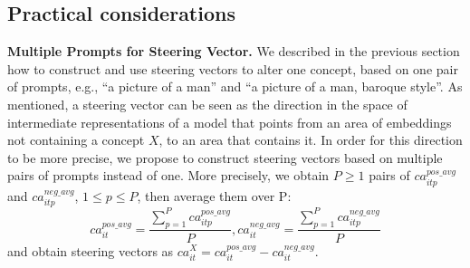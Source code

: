  
\subsection{Practical considerations}
\label{3.4}

\noindent\textbf{Multiple Prompts for Steering Vector.} 
We described in the previous section how to construct and use steering vectors to alter one concept,  based on one pair of prompts, e.g., ``a picture of a man'' and ``a picture of a man, baroque style''.
%
As mentioned, a steering vector can be seen as the direction in the space of intermediate representations of a model that points from an area of embeddings not containing a concept $X$, to an area that contains it.
%
In order for this direction to be more precise, we propose to construct steering vectors based on multiple pairs of prompts instead of one.
%
More precisely, we obtain $P \geqslant 1$ pairs of $ca^{pos\_avg}_{itp}$ and $ca^{neg\_avg}_{itp}$, $1 \leqslant p \leqslant P$, then average them over P:
\begin{equation}
    ca^{pos\_avg}_{it} = \frac{\sum_{p=1}^{P}ca^{pos\_avg}_{itp}}{P}, ca^{neg\_avg}_{it} = \frac{\sum_{p=1}^{P}ca^{neg\_avg}_{itp}}{P}
\end{equation}
\noindent and obtain steering vectors as $ca^{X}_{it} = ca^{pos\_avg}_{it} - ca^{neg\_avg}_{it}$.

